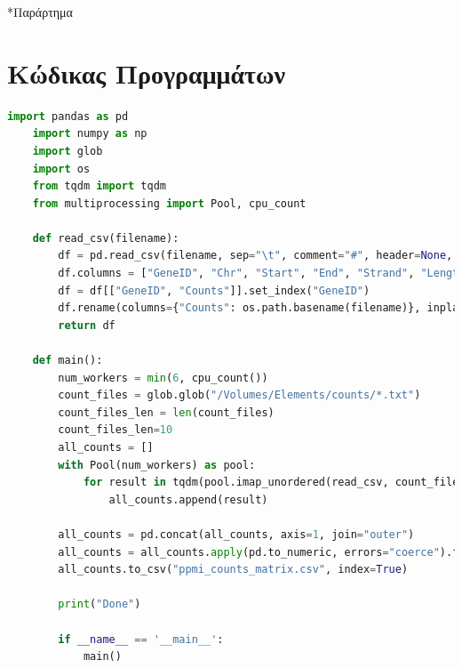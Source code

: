 \documentclass[12pt]{report}
\makeatletter
\let\oldchapter\chapter
\renewcommand{\chapter}{\@ifstar{\starchapter}{\nostarchapter}}
\newcommand{\starchapter}[1]{\oldchapter*{#1}\thispagestyle{mainstyle}}
\newcommand{\nostarchapter}[1]{\oldchapter{#1}\thispagestyle{mainstyle}}
\makeatother
\begin{document}

    \cleardoublepage
    \appendix
    \chapter*{Παράρτημα}
    
    \section*{Κώδικας Προγραμμάτων}\label{thesis:code}
    \begin{lstlisting}[language=Python,caption={read-data.py: Συκγρότηση CSV αρχείου με το σύνολο των δειγμάτων},label=lst:readdatapy]
    import pandas as pd
    import numpy as np
    import glob
    import os
    from tqdm import tqdm
    from multiprocessing import Pool, cpu_count
    
    def read_csv(filename):
        df = pd.read_csv(filename, sep="\t", comment="#", header=None, skiprows=1)
        df.columns = ["GeneID", "Chr", "Start", "End", "Strand", "Length", "Counts"]
        df = df[["GeneID", "Counts"]].set_index("GeneID")
        df.rename(columns={"Counts": os.path.basename(filename)}, inplace=True)
        return df
    
    def main():
        num_workers = min(6, cpu_count())
        count_files = glob.glob("/Volumes/Elements/counts/*.txt")
        count_files_len = len(count_files)
        count_files_len=10
        all_counts = []
        with Pool(num_workers) as pool:
            for result in tqdm(pool.imap_unordered(read_csv, count_files[1:10]), total=count_files_len, desc="Reading files"):
                all_counts.append(result)
    
        all_counts = pd.concat(all_counts, axis=1, join="outer")
        all_counts = all_counts.apply(pd.to_numeric, errors="coerce").fillna(0)
        all_counts.to_csv("ppmi_counts_matrix.csv", index=True)
    
        print("Done")

        if __name__ == '__main__':
            main()
    \end{lstlisting}
\end{document}
